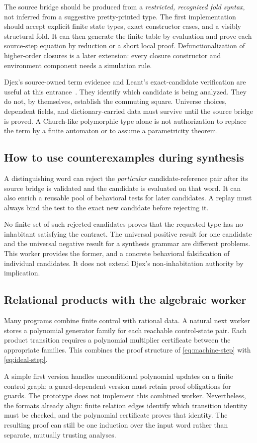 The source bridge should be produced from a \emph{restricted, recognized fold syntax}, not inferred from a suggestive pretty-printed type. The first implementation should accept explicit finite state types, exact constructor cases, and a visibly structural fold. It can then generate the finite table by evaluation and prove each source-step equation by reduction or a short local proof. Defunctionalization of higher-order closures is a later extension: every closure constructor and environment component needs a simulation rule.

Djex's source-owned term evidence and Leant's exact-candidate verification are useful at this entrance~\cite{djex-readme,leant-readme}. They identify which candidate is being analyzed. They do not, by themselves, establish the commuting square. Universe choices, dependent fields, and dictionary-carried data must survive until the source bridge is proved. A Church-like polymorphic type alone is not authorization to replace the term by a finite automaton or to assume a parametricity theorem.

\subsection{How to use counterexamples during synthesis}

A distinguishing word can reject the \emph{particular} candidate-reference pair after its source bridge is validated and the candidate is evaluated on that word. It can also enrich a reusable pool of behavioral tests for later candidates. A replay must always bind the test to the exact new candidate before rejecting it.

No finite set of such rejected candidates proves that the requested type has no inhabitant satisfying the contract. The universal positive result for one candidate and the universal negative result for a synthesis grammar are different problems. This worker provides the former, and a concrete behavioral falsification of individual candidates. It does not extend Djex's non-inhabitation authority by implication.

\subsection{Relational products with the algebraic worker}

Many programs combine finite control with rational data. A natural next worker stores a polynomial generator family for each reachable control-state pair. Each product transition requires a polynomial multiplier certificate between the appropriate families. This combines the proof structure of \eqref{eq:machine-step} with \eqref{eq:ideal-step}.

A simple first version handles unconditional polynomial updates on a finite control graph; a guard-dependent version must retain proof obligations for guards. The prototype does not implement this combined worker. Nevertheless, the formats already align: finite relation edges identify which transition identity must be checked, and the polynomial certificate proves that identity. The resulting proof can still be one induction over the input word rather than separate, mutually trusting analyses.
